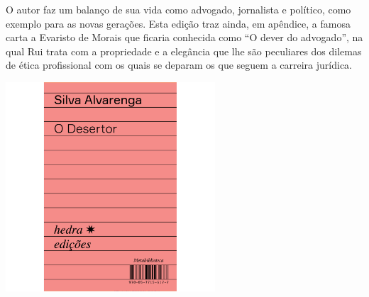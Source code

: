 O autor faz um balanço de sua vida
como advogado, jornalista e político, como exemplo para as novas
gerações. Esta edição traz ainda, em apêndice, a famosa carta
a Evaristo de Morais que ficaria conhecida como ``O dever do advogado'',
na qual Rui trata com a propriedade e a elegância que lhe são peculiares
dos dilemas de ética profissional com os quais se deparam os que 
seguem a carreira jurídica. 

\vfill

\hspace*{-.4cm}\begin{minipage}[c]{.5\linewidth}
\small{
{}}
\end{minipage}

\pagebreak

\begin{center}
\hspace*{-3.5cm}
\hspace*{3cm}\includegraphics[width=78mm]{./grid/desertor.jpg}
\end{center}

\hspace*{-7cm}\hrulefill\hspace*{-7cm}

